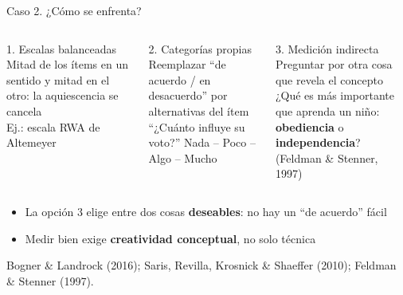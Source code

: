 \documentclass[aspectratio=169,11pt]{beamer}
\newcommand{\hl}[1]{\textcolor{marino}{\textbf{#1}}}        %
\newcommand{\fuente}[1]{\par\vfill{\scriptsize\color{gris}#1\par}}
\begin{document}
\begin{frame}{Caso 2. ¿Cómo se enfrenta?}
\begin{columns}[T]
\begin{block}{1. Escalas balanceadas}
\small
Mitad de los ítems en un sentido y mitad en el otro: la aquiescencia se cancela\\[3pt]
\footnotesize Ej.: escala RWA de Altemeyer
\end{block}
\begin{block}{2. Categorías propias}
\small
Reemplazar ``de acuerdo / en desacuerdo'' por alternativas del ítem\\[3pt]
\footnotesize ``¿Cuánto influye su voto?'' Nada -- Poco -- Algo -- Mucho
\end{block}
\begin{block}{3. Medición indirecta}
\small
Preguntar por otra cosa que revela el concepto\\[3pt]
\footnotesize ¿Qué es más importante que aprenda un niño: \textbf{obediencia} o \textbf{independencia}? (Feldman \& Stenner, 1997)
\end{block}
\end{columns}
\bigskip
\begin{itemize}
  \item La opción 3 elige entre dos cosas \textbf{deseables}: no hay un ``de acuerdo'' fácil
  \item Medir bien exige \hl{creatividad conceptual}, no solo técnica
\end{itemize}
\fuente{Bogner \& Landrock (2016); Saris, Revilla, Krosnick \& Shaeffer (2010); Feldman \& Stenner (1997).}
\end{frame}
\end{document}
